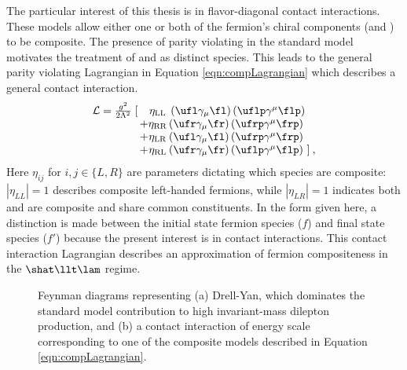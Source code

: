 The particular interest of this thesis is in flavor-diagonal contact interactions.
These models allow either one or both of the fermion's chiral components (\fl and \fr) to be composite.
The presence of parity violating in the standard model motivates the treatment of \fl and \fr as distinct species.
This leads to the general parity violating Lagrangian in Equation \ref{eqn:compLagrangian} which describes a general contact interaction.
\begin{equation}\label{eqn:compLagrangian}
\begin{array}{r@{\,}c@{}c@{\,}l@{\,}l}
\mathcal L = \frac{g^2}{2\Lambda^2}\;[ && \eta_{\mathrm{LL}}&\, (\ufl\gamma_{\mu} \fl)\,(\uflp\gamma^{\mu}\flp) \nonumber \\
& +&\eta_{\mathrm{RR}}& (\ufr\gamma_{\mu} \fr) \,(\ufrp\gamma^{\mu}\frp) \\
&+&\eta_{\mathrm{LR}}& (\ufl\gamma_{\mu} \fl) \,(\ufrp\gamma^{\mu}\frp) \\
&+&\eta_{\mathrm{RL}}& (\ufr\gamma_{\mu} \fr) \,(\uflp\gamma^{\mu}\flp)& ] \: ,\nonumber
\end{array}
\end{equation}
Here $\eta_{ij}$ for $i,j\in\{L,R\}$ are parameters dictating which species are composite: $|\eta_{LL}|=1$ describes composite left-handed fermions, while $|\eta_{LR}|=1$ indicates both \fr and \fl are composite and share common constituents.
In the form given here, a distinction is made between the initial state fermion species ($f$) and final state species ($f'$) because the present interest is in \llqq contact interactions.
This contact interaction Lagrangian describes an approximation of fermion compositeness in the $\shat\llt\lam$ regime.

\begin{figure}[h!]
\captionsetup[subfigure]{position=b}
\centering
{}
\caption{Feynman diagrams representing (a) Drell-Yan, which dominates the standard model contribution to high invariant-mass dilepton production, and (b) a contact interaction of energy scale \lam corresponding to one of the composite models described in Equation \ref{eqn:compLagrangian}.}
\label{fig:ciPheno}
\end{figure}

